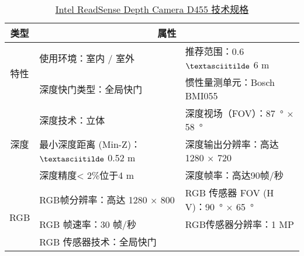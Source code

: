\begin{table}[htb]
	\centering
	\caption{\href{https://www.intelrealsense.com/zh-hans/depth-camera-d455/}{Intel ReadSense Depth Camera D455 技术规格}}
	\label{Intel_ReadSense_Depth_Camera_D455}
	\begin{tabular}{c|ll}
		\toprule
		类型                   & \multicolumn{2}{c}{属性}                                                                                                                                    \\

		\midrule
		\multirow{2}{*}{特性}  & 使用环境：室内 / 室外                                                                        & 推荐范围：0.6 $\textasciitilde$ 6 m                                      \\
		                     & 深度快门类型：全局快门                                                                         & 惯性量测单元：Bosch BMI055                                                 \\

		\midrule
		\multirow{3}{*}{深度}  & 深度技术：立体                                                                             & 深度视场（FOV）：\SI{87}{\degree} $\times$ \SI{58}{\degree}                \\
		                     & 最小深度距离 (Min-Z)：$\textasciitilde$ 0.52 m                                             & 深度输出分辨率：高达 1280 $\times$ 720                                        \\
		                     & 深度精度< 2\%位于4 m                                                                      & 深度帧率：高达90帧/秒                                                        \\

		\midrule
		\multirow{3}{*}{RGB} & RGB帧分辨率：高达 1280 $\times$ 800                                                        & RGB 传感器 FOV (H \times V)：\SI{90}{\degree} $\times$ \SI{65}{\degree} \\
		                     & RGB 帧速率：30 帧/秒                                                                      & RGB传感器分辨率：1 MP                                                      \\
		                     & RGB 传感器技术：全局快门                                                                      &                                                                     \\


\end{tabular}
\end{table}
